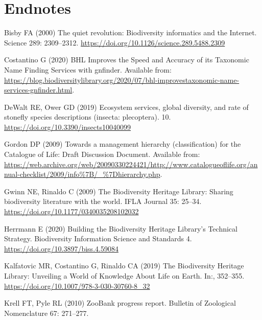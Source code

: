\documentclass[
]{article}
\newlength{\cslhangindent}
\newlength{\cslentryspacingunit} %
\newenvironment{CSLReferences}[2] %
 {%
  \setlength{\parindent}{0pt}
  \ifodd #1
  \let\oldpar\par
  \def\par{\hangindent=\cslhangindent\oldpar}
  \fi
  \setlength{\parskip}{#2\cslentryspacingunit}
 }%
 {}
\begin{document}
\hypertarget{endnotes}{%
\section*{Endnotes}\label{endnotes}}

\hypertarget{refs}{}
\begin{CSLReferences}{1}{0}
\leavevmode{}%
Bisby FA (2000) {The quiet revolution: Biodiversity informatics and the
Internet}. Science 289: 2309--2312.
\url{https://doi.org/10.1126/science.289.5488.2309}

\leavevmode{}%
Costantino G (2020) {BHL Improves the Speed and Accuracy of its
Taxonomic Name Finding Services with gnfinder}. Available from:
\url{https://blog.biodiversitylibrary.org/2020/07/bhl-improvestaxonomic-name-services-gnfinder.html}.

\leavevmode{}%
DeWalt RE, Ower GD (2019) Ecosystem services, global diversity, and rate
of stonefly species descriptions (insecta: plecoptera). 10.
\url{https://doi.org/10.3390/insects10040099}

\leavevmode{}%
Gordon DP (2009) {Towards a management hierarchy (classification) for
the Catalogue of Life: Draft Discussion Document}. Available from:
\url{https://web.archive.org/web/20090330224421/http://www.catalogueoflife.org/annual-checklist/2009/info\%7B/_\%7Dhierarchy.php}.

\leavevmode{}%
Gwinn NE, Rinaldo C (2009) {The Biodiversity Heritage Library: Sharing
biodiversity literature with the world}. IFLA Journal 35: 25--34.
\url{https://doi.org/10.1177/0340035208102032}

\leavevmode{}%
Herrmann E (2020) {Building the Biodiversity Heritage Library's
Technical Strategy}. Biodiversity Information Science and Standards 4.
\url{https://doi.org/10.3897/biss.4.59084}

\leavevmode{}%
Kalfatovic MR, Costantino G, Rinaldo CA (2019) {The Biodiversity
Heritage Library: Unveiling a World of Knowledge About Life on Earth}.
In:, 352--355. \url{https://doi.org/10.1007/978-3-030-30760-8_32}

\leavevmode{}%
Krell FT, Pyle RL (2010) {ZooBank progress report}. Bulletin of
Zoological Nomenclature 67: 271--277.


\end{CSLReferences}
\end{document}
